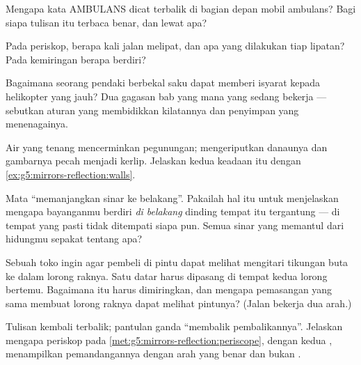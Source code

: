 \begin{exercise}[$\star$]\label{exo:g5:mirrors-reflection:5}
Mengapa kata AMBULANS dicat terbalik di bagian depan mobil ambulans?
Bagi siapa tulisan itu terbaca benar, dan lewat apa?
\end{exercise}

\begin{exercise}[$\star$]\label{exo:g5:mirrors-reflection:6}
Pada periskop, berapa kali jalan  melipat, dan apa yang
dilakukan tiap lipatan? Pada kemiringan berapa  berdiri?
\end{exercise}

\begin{exercise}[$\star$]\label{exo:g5:mirrors-reflection:7}
Bagaimana seorang pendaki berbekal  saku dapat memberi isyarat
kepada helikopter yang jauh? Dua gagasan bab yang mana yang sedang
bekerja --- sebutkan aturan yang membidikkan kilatannya dan penyimpan
yang menenagainya.
\end{exercise}

\begin{exercise}[$\star$]\label{exo:g5:mirrors-reflection:8}
Air yang tenang mencerminkan pegunungan;  mengeriputkan danaunya
dan gambarnya pecah menjadi kerlip. Jelaskan kedua keadaan itu dengan
\cref{ex:g5:mirrors-reflection:walls}.
\end{exercise}

\begin{exercise}[$\star\star$]\label{exo:g5:mirrors-reflection:9}
Mata ``memanjangkan sinar ke belakang''. Pakailah hal itu untuk
menjelaskan mengapa bayanganmu berdiri \emph{di belakang} dinding
tempat  itu tergantung --- di tempat yang pasti tidak ditempati
siapa pun. Semua sinar yang memantul dari hidungmu sepakat tentang apa?
\end{exercise}

\begin{exercise}[$\star\star$]\label{exo:g5:mirrors-reflection:10}
Sebuah toko ingin agar pembeli di pintu dapat melihat mengitari
tikungan buta ke dalam lorong raknya. Satu  datar harus dipasang
di tempat kedua lorong bertemu. Bagaimana  itu harus
dimiringkan, dan mengapa pemasangan yang sama membuat lorong raknya
dapat melihat pintunya? (Jalan  bekerja dua arah.)
\end{exercise}

\begin{exercise}[$\star\star$]\label{exo:g5:mirrors-reflection:11}
Tulisan  kembali terbalik; pantulan ganda ``membalik
pembalikannya''. Jelaskan mengapa periskop pada
\cref{met:g5:mirrors-reflection:periscope}, dengan kedua ,
menampilkan pemandangannya dengan arah yang benar dan bukan
.
\end{exercise}
